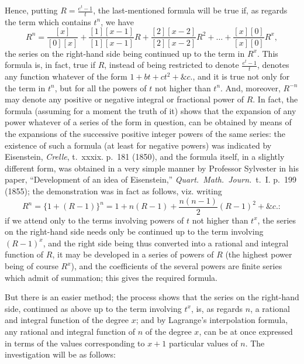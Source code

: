 \documentclass[11pt,a4paper]{article}
\theoremstyle{definition}
\begin{document}
Hence, putting $R=\frac{e^t-1}{t}$, the last-mentioned formula will be true if, as regards the term which contains $t^n$, we have
\[
R^n=\frac{[x]}{[0][x]}+\frac{[1][x-1]}{[1][x-1]}R+\frac{[2][x-2]}{[2][x-2]}R^2+\ldots+\frac{[x][0]}{[x][0]}R^x,
\]
the series on the right-hand side being continued up to the term in $R^x$. This formula is, in fact, true if $R$, instead of being restricted to denote $\frac{e^t-1}{t}$, denotes any function whatever of the form $1+bt+ct^2+\&c.$, and it is true not only for the term in $t^n$, but for all the powers of $t$ not higher than $t^n$. And, moreover, $R^{-n}$ may denote any positive or negative integral or fractional power of $R$. In fact, the formula (assuming for a moment the truth of it) shows that the expansion of any power whatever of a series of the form in question, can be obtained by means of the expansions of the successive positive integer powers of the same series: the existence of such a formula (at least for negative powers) was indicated by Eisenstein, \textit{Crelle}, t.~xxxix. p.~181 (1850), and the formula itself, in a slightly different form, was obtained in a very simple manner by Professor Sylvester in his paper, ``Development of an idea of Eisenstein,'' \textit{Quart.\ Math.\ Journ.}\ t.~I. p.~199 (1855); the demonstration was in fact as follows, viz. writing
\[
R^n=\{1+(R-1)\}^n=1+n(R-1)+\frac{n(n-1)}{2}(R-1)^2+\&c.:
\]
if we attend only to the terms involving powers of $t$ not higher than $t^x$, the series on the right-hand side needs only be continued up to the term involving $(R-1)^x$, and the right side being thus converted into a rational and integral function of $R$, it may be developed in a series of powers of $R$ (the highest power being of course $R^x$), and the coefficients of the several powers are finite series which admit of summation; this gives the required formula.

But there is an easier method; the process shows that the series on the right-hand side, continued as above up to the term involving $t^x$, is, as regards $n$, a rational and integral function of the degree $x$; and by Lagrange's interpolation formula, any rational and integral function of $n$ of the degree $x$, can be at once expressed in terms of the values corresponding to $x+1$ particular values of $n$. The investigation will be as follows:
\end{document}
